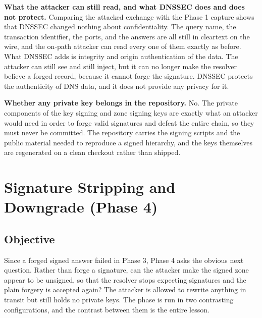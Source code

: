 \documentclass[11pt]{article}
\begin{document}
\textbf{What the attacker can still read, and what DNSSEC does and does not
protect.} Comparing the attacked exchange with the Phase 1 capture shows that
DNSSEC changed nothing about confidentiality. The query name, the transaction
identifier, the ports, and the answers are all still in cleartext on the wire, and
the on-path attacker can read every one of them exactly as before. What DNSSEC adds
is integrity and origin authentication of the data. The attacker can still see and
still inject, but it can no longer make the resolver believe a forged record,
because it cannot forge the signature. DNSSEC protects the authenticity of DNS
data, and it does not provide any privacy for it.

\textbf{Whether any private key belongs in the repository.} No. The private
components of the key signing and zone signing keys are exactly what an attacker
would need in order to forge valid signatures and defeat the entire chain, so they
must never be committed. The repository carries the signing scripts and the public
material needed to reproduce a signed hierarchy, and the keys themselves are
regenerated on a clean checkout rather than shipped.


\clearpage

\section{Signature Stripping and Downgrade (Phase 4)}

\subsection{Objective}

Since a forged signed answer failed in Phase 3, Phase 4 asks the obvious next
question. Rather than forge a signature, can the attacker make the signed zone
appear to be unsigned, so that the resolver stops expecting signatures and the
plain forgery is accepted again? The attacker is allowed to rewrite anything in
transit but still holds no private keys. The phase is run in two contrasting
configurations, and the contrast between them is the entire lesson.
\end{document}
